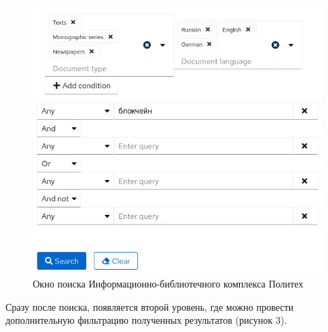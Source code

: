 \documentclass[a4paper, 12pt]{report}		%
\begin{document}
\begin{figure}[H]
 \centering
 \includegraphics[scale=0.8]{res/src2}
 \caption{Окно поиска Информационно-библиотечного комплекса Политех}
\end{figure}

Сразу после поиска, появляется второй уровень, где можно провести дополнительную фильтрацию полученных результатов (рисунок 3).
\end{document}
